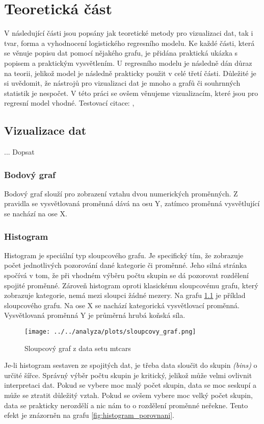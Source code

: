 \chapter{Teoretická část}
V následující části jsou popsány jak teoretické metody pro vizualizaci dat, tak i tvar, forma a vyhodnocení logistického regresního modelu. 
Ke každé části, která se věnuje popisu dat pomocí nějakého grafu, je přidána praktická ukázka s popisem a praktickým vysvětlením. U regresního 
modelu je následně dán důraz na teorii, jelikož model je následně prakticky použit v celé třetí části. Důležité je si uvědomit, že nástrojů pro
vizualizaci dat je mnoho a grafů či souhrnných statistik je nespočet. V této práci se ovšem věnujeme vizualizacím, které jsou pro regresní model
vhodné.
Testovací citace: \cite{Hebak2015}, \cite{Kleinbaum2010}
\section{Vizualizace dat}
... Dopsat

\subsection{Bodový graf}
Bodový graf slouží pro zobrazení vztahu dvou numerických proměnných. Z pravidla se vysvětlovaná proměnná dává na osu Y,
zatímco proměnná vysvětlující se nachází na ose X.  
\newpage
\subsection{Histogram}
Histogram je speciální typ sloupcového grafu. Je specifický tím, že zobrazuje počet jednotlivých pozorování dané kategorie či proměnné. Jeho silná stránka spočívá v tom,
že při vhodném výběru počtu skupin se dá pozorovat rozdělení spojité proměnné.
Zároveň histogram oproti klasickému sloupcovému grafu, který zobrazuje kategorie, nemá mezi sloupci žádné mezery. Na grafu 
\ref{fig:sloupcovy_graf} je příklad sloupcového grafu. Na ose X se nachází kategorická vysvětlovací proměnná. Vysvětlovaná proměnná Y je průměrná hrubá
koňská síla.

\begin{figure}[H]
    \centering
    \texttt{[image: ../../analyza/plots/sloupcovy\_graf.png]}
    \caption{Sloupcový graf z data setu mtcars} 
    \label{fig:sloupcovy_graf}
\end{figure}

Je-li histogram sestaven ze spojitých dat, je třeba data sloučit do skupin \textit{(bins)} o určité šířce. Správný výběr
počtu skupin je kritický, jelikož může velmi ovlivnit interpretaci dat. Pokud se vybere moc malý počet skupin, data se moc seskupí a
může se ztratit důležitý vztah. Pokud se ovšem vybere moc velký počet skupin, data se prakticky nerozdělí a nic nám to o rozdělení proměnné neřekne.
Tento efekt je znázorněn na grafu \ref{fig:histogram_porovnani}.

